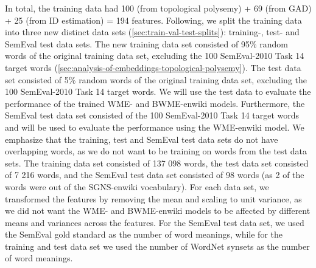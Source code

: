 In total, the training data had 100 (from topological polysemy) + 69 (from GAD) + 25 (from ID estimation) = 194 features. Following, we split the training data into three new distinct data sets (\cref{sec:train-val-test-splits}): training-, test- and SemEval test data sets. The new training data set consisted of 95\% random words of the original training data set, excluding the 100 SemEval-2010 Task 14 target words (\cref{sec:analysis-of-embeddings-topological-polysemy}). The test data set consisted of 5\% random words of the original training data set, excluding the 100 SemEval-2010 Task 14 target words. We will use the test data to evaluate the performance of the trained WME- and BWME-enwiki models. Furthermore, the SemEval test data set consisted of the 100 SemEval-2010 Task 14 target words and will be used to evaluate the performance using the WME-enwiki model. We emphasize that the training, test and SemEval test data sets do not have overlapping words, as we do not want to be training on words from the test data sets. The training data set consisted of 137 098 words, the test data set consisted of 7 216 words, and the SemEval test data set consisted of 98 words (as 2 of the words were out of the SGNS-enwiki vocabulary). For each data set, we transformed the features by removing the mean and scaling to unit variance, as we did not want the WME- and BWME-enwiki models to be affected by different means and variances across the features. For the SemEval test data set, we used the SemEval gold standard as the number of word meanings, while for the training and test data set we used the number of WordNet synsets as the number of word meanings.

